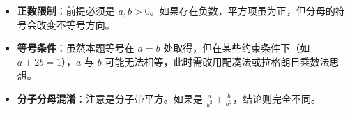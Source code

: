 \begin{trapbox}
\begin{itemize}
    \item \textbf{正数限制}：前提必须是 $a, b > 0$。如果存在负数，平方项虽为正，但分母的符号会改变不等号方向。
    \item \textbf{等号条件}：虽然本题等号在 $a=b$ 处取得，但在某些约束条件下（如 $a+2b=1$），$a$ 与 $b$ 可能无法相等，此时需改用配凑法或拉格朗日乘数法思想。
    \item \textbf{分子分母混淆}：注意是分子带平方。如果是 $\frac{a}{b^2} + \frac{b}{a^2}$，结论则完全不同。
\end{itemize}
\end{trapbox}
